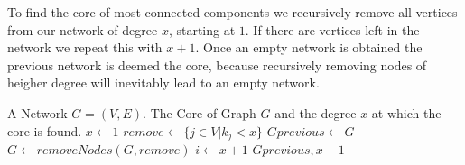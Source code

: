 To find the core of most connected components we recursively remove all vertices from our network of degree $x$, starting at $1$. If there are vertices left in the network we repeat this with $x+1$. Once an empty network is obtained the previous network is deemed the core, because  recursively removing nodes of heigher degree will inevitably lead to an empty network. 
\newcommand{\FindCore}{\ensuremath{\mbox{\sc FindCore}}}
\begin{algorithm}[h!]
\caption{$\FindCore(Network)$}\label{alg:findcore}
\begin{algorithmic}
\REQUIRE A Network $G=(V,E)$.
\ENSURE The Core of Graph $G$ and the degree $x$ at which the core is found.
\medskip
\STATE $x\gets 1$
	\STATE $remove\gets \{j\in V | k_j<x\}$
	\STATE $Gprevious \gets G$
		\STATE $G\gets removeNodes(G, remove)$ 
	\ENDWHILE
	\STATE $i \gets x+1$
\ENDWHILE
\RETURN $Gprevious, x-1$
\end{algorithmic}
\end{algorithm}

%
